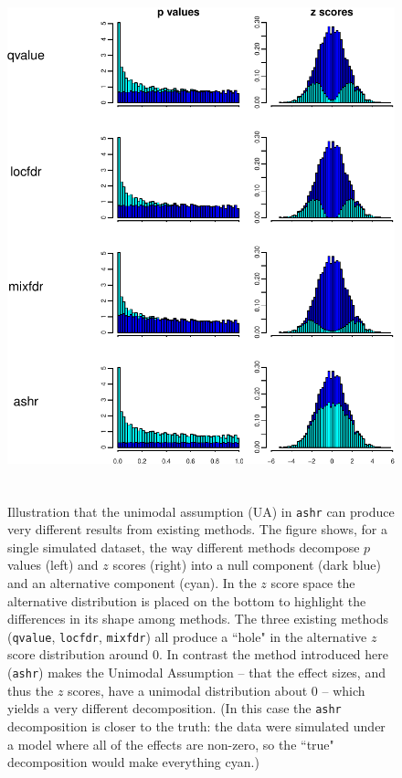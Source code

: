 \documentclass[11pt]{article}
\def\qvalue{{\tt qvalue}\xspace}
\def\locfdr{{\tt locfdr}\xspace}
\def\mixfdr{{\tt mixfdr}\xspace}
\def\ashr{{\tt ashr}\xspace}
\begin{document}
\begin{figure}
\center \includegraphics[height=6in]{../analysis/figure/makefig_FDReg.Rmd/decomp_ZA-1.pdf}
\caption{Illustration that the unimodal assumption (UA) in \ashr can produce very different results from existing methods.
The figure shows, for a single simulated dataset, the way different methods decompose $p$ values (left) and $z$ scores (right) into a null component (dark blue) and an alternative component (cyan). In the $z$ score space the alternative distribution is placed on the bottom to highlight the differences in its shape among methods.
The three existing methods (\qvalue, \locfdr, \mixfdr) all produce a ``hole" in the alternative $z$ score distribution around 0.
In contrast the method introduced here (\ashr) makes the Unimodal Assumption -- that the effect sizes, and thus the $z$ scores, have a unimodal distribution about 0 -- which yields a very different decomposition. (In this case the \ashr decomposition is closer to the truth: the data were simulated under a model where all of the effects are non-zero, so the ``true" decomposition would make everything cyan.)} \label{fig:ZA}
\end{figure}
\end{document}
